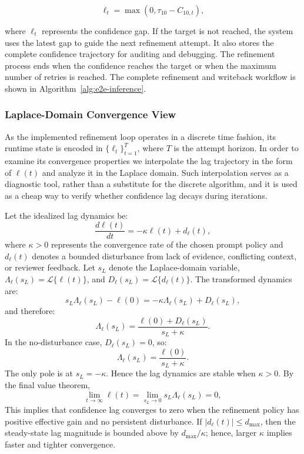 \documentclass[manuscript,review]{acmart}
\begin{document}
\begin{equation}
\ell_t=\max(0,\tau_{10}-C_{10,t}),
\end{equation}

where $\ell_t$ represents the confidence gap. If the target is not reached,
the system uses the latest gap to guide the next refinement attempt. It also
stores the complete confidence trajectory for auditing and debugging. The
refinement process ends when the confidence reaches the target or when the
maximum number of retries is reached.
The complete refinement and writeback workflow is shown in Algorithm~\ref{alg:e2e-inference}.

\subsubsection{Laplace-Domain Convergence View}

As the implemented refinement loop operates in a discrete time fashion, its runtime state is encoded in \(\{\ell_t\}_{t=1}^{T}\), where $T$ is the attempt horizon. In order to examine its convergence properties we interpolate the lag trajectory in the form of \(\ell(t)\) and analyze it in the Laplace domain. Such interpolation serves as a diagnostic tool, rather than a substitute for the discrete algorithm, and it is used as a cheap way to verify whether confidence lag decays during iterations.

Let the idealized lag dynamics be:
\begin{equation}
\frac{d\ell(t)}{dt} = -\kappa \ell(t) + d_{\ell}(t),
\end{equation}
where \(\kappa>0\) represents the convergence rate of the chosen prompt policy and \(d_{\ell}(t)\) denotes a bounded disturbance from lack of evidence, conflicting context, or reviewer feedback. Let $s_L$ denote the Laplace-domain variable, $\Lambda_{\ell}(s_L)=\mathcal{L}\{\ell(t)\}$, and $D_{\ell}(s_L)=\mathcal{L}\{d_{\ell}(t)\}$. The transformed dynamics are:
\begin{equation}
s_L\Lambda_{\ell}(s_L)-\ell(0)=-\kappa\Lambda_{\ell}(s_L)+D_{\ell}(s_L),
\end{equation}
and therefore:
\begin{equation}
\Lambda_{\ell}(s_L)=\frac{\ell(0)+D_{\ell}(s_L)}{s_L+\kappa}.
\end{equation}
In the no-disturbance case, \(D_{\ell}(s_L)=0\), so:
\begin{equation}
\Lambda_{\ell}(s_L)=\frac{\ell(0)}{s_L+\kappa}.
\end{equation}
The only pole is at \(s_L=-\kappa\). Hence the lag dynamics are stable when \(\kappa>0\). By the final value theorem,
\begin{equation}
\lim_{t\to\infty}\ell(t)=\lim_{s_L\to 0}s_L\Lambda_{\ell}(s_L)=0,
\end{equation}
This implies that confidence lag converges to zero when the refinement policy has positive effective gain and no persistent disturbance. If $|d_{\ell}(t)|\le d_{\max}$, then the steady-state lag magnitude is bounded above by $d_{\max}/\kappa$; hence, larger \(\kappa\) implies faster and tighter convergence.
\end{document}

